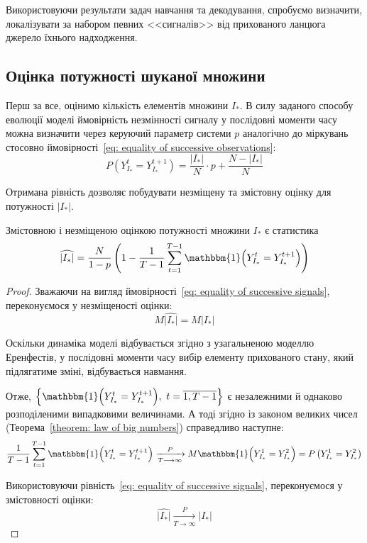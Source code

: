Використовуючи результати задач навчання та декодування, спробуємо визначити, локалізувати за набором певних <<сигналів>> від прихованого ланцюга джерело їхнього надходження.

\subsection{Оцінка потужності шуканої множини}

Перш за все, оцінимо кількість елементів множини $I_*$. В силу заданого способу еволюції моделі ймовірність незмінності сигналу у послідовні моменти часу можна визначити через керуючий параметр системи $p$ аналогічно до міркувань стосовно ймовірності~\eqref{eq: equality of successive observations}:
\begin{equation}\label{eq: equality of successive signals}
    P\left( Y^t_{I_*}=Y^{t+1}_{I_*} \right) = \frac{\left| I_* \right|}{N}\cdot p + \frac{N-\left| I_* \right|}{N}
\end{equation}

Отримана рівність дозволяє побудувати незміщену та змістовну оцінку для потужності $|I_*|$.

\begin{claim}
    Змістовною і незміщеною оцінкою потужності множини $I_*$ є статистика
    \begin{equation}\label{eq: ||I*|| estimation}
        \widehat{|I_*|} = \frac{N}{1-p} \left( 1-\frac{1}{T-1}\sum_{t=1}^{T-1}\mathbbm{1} \Bigl( Y^t_{I_*}=Y^{t+1}_{I_*} \Bigr) \right) 
    \end{equation}
\end{claim}
\begin{proof}
    Зважаючи на вигляд ймовірності~\eqref{eq: equality of successive signals}, переконуємося у незміщеності оцінки:
    \begin{equation*}
        M\widehat{|I_*|} = M|I_*| 
    \end{equation*}

    Оскільки динаміка моделі відбувається згідно з узагальненою моделлю Еренфестів, у послідовні моменти часу вибір елементу прихованого стану, який підлягатиме зміні, відбувається навмання. 
    
    Отже, $\left\{ \mathbbm{1} \Bigl( Y^t_{I_*}=Y^{t+1}_{I_*} \Bigr),\ t=\overline{1,T-1} \right\}$ є незалежними й однаково розподіленими випадковими величинами. А тоді згідно із законом великих чисел (Теорема~\ref{theorem: law of big numbers}) справедливо наступне:
    \begin{equation*}
        \frac{1}{T-1}\sum_{t=1}^{T-1}\mathbbm{1} \Bigl( Y^t_{I_*}=Y^{t+1}_{I_*} \Bigr) \xrightarrow[T \longrightarrow \infty]{P} M\mathbbm{1} \Bigl( Y^1_{I_*}=Y^2_{I_*} \Bigr) = P\left( Y^1_{I_*}=Y^2_{I_*} \right)
    \end{equation*}

    Використовуючи рівність~\eqref{eq: equality of successive signals}, переконуємося у змістовності оцінки:
    \begin{equation*}
        \widehat{|I_*|} \xrightarrow[T \longrightarrow \infty]{P} |I_*| 
    \end{equation*}
\end{proof}

